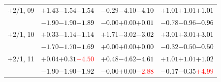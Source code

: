 \documentclass[compress]{beamer}
\begin{document}
\begin{frame}
\begin{tabular}{r | c | c | c}
$+$2/1, 09 & $+1.43$\hspace{0.1 cm}$-1.54$\hspace{0.1 cm}\textcolor{black}{$-1.54$} & $-0.29$\hspace{0.1 cm}$-4.10$\hspace{0.1 cm}\textcolor{black}{$-4.10$} & $+1.01$\hspace{0.1 cm}$+1.01$\hspace{0.1 cm}\textcolor{black}{$+1.01$} \\
           & $-1.90$\hspace{0.1 cm}$-1.90$\hspace{0.1 cm}\textcolor{black}{$-1.89$} & $-0.00$\hspace{0.1 cm}$+0.00$\hspace{0.1 cm}\textcolor{black}{$+0.01$} & $-0.78$\hspace{0.1 cm}$-0.96$\hspace{0.1 cm}\textcolor{black}{$-0.96$} \\
$+$2/1, 10 & $+0.33$\hspace{0.1 cm}$-1.14$\hspace{0.1 cm}\textcolor{black}{$-1.14$} & $+1.71$\hspace{0.1 cm}$-3.02$\hspace{0.1 cm}\textcolor{black}{$-3.02$} & $+3.01$\hspace{0.1 cm}$+3.01$\hspace{0.1 cm}\textcolor{black}{$+3.01$} \\
           & $-1.70$\hspace{0.1 cm}$-1.70$\hspace{0.1 cm}\textcolor{black}{$-1.69$} & $+0.00$\hspace{0.1 cm}$+0.00$\hspace{0.1 cm}\textcolor{black}{$+0.00$} & $-0.32$\hspace{0.1 cm}$-0.50$\hspace{0.1 cm}\textcolor{black}{$-0.50$} \\
$+$2/1, 11 & $+0.04$\hspace{0.1 cm}$+0.31$\hspace{0.1 cm}\textcolor{red}{$-4.50$} & $+0.48$\hspace{0.1 cm}$-4.62$\hspace{0.1 cm}\textcolor{black}{$-4.61$} & $+1.01$\hspace{0.1 cm}$+1.01$\hspace{0.1 cm}\textcolor{black}{$+1.02$} \\
           & $-1.90$\hspace{0.1 cm}$-1.90$\hspace{0.1 cm}\textcolor{black}{$-1.92$} & $-0.00$\hspace{0.1 cm}$+0.00$\hspace{0.1 cm}\textcolor{red}{$-2.88$} & $-0.17$\hspace{0.1 cm}$-0.35$\hspace{0.1 cm}\textcolor{red}{$+4.99$} \\

\end{tabular}
\end{frame}
\end{document}
